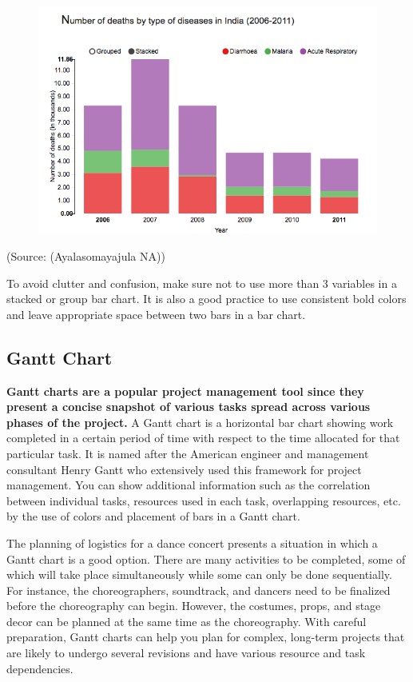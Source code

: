\documentclass[]{book}
\theoremstyle{definition}
\theoremstyle{definition}
\theoremstyle{definition}
\theoremstyle{remark}
\begin{document}
\begin{figure}
\centering
\includegraphics{images/aya-bar2.png}
\caption{}
\end{figure}

(Source: (Ayalasomayajula NA))

To avoid clutter and confusion, make sure not to use more than 3
variables in a stacked or group bar chart. It is also a good practice to
use consistent bold colors and leave appropriate space between two bars
in a bar chart.

\subsection{Gantt Chart}\label{gantt-chart}

\textbf{Gantt charts are a popular project management tool since they
present a concise snapshot of various tasks spread across various phases
of the project.} A Gantt chart is a horizontal bar chart showing work
completed in a certain period of time with respect to the time allocated
for that particular task. It is named after the American engineer and
management consultant Henry Gantt who extensively used this framework
for project management. You can show additional information such as the
correlation between individual tasks, resources used in each task,
overlapping resources, etc. by the use of colors and placement of bars
in a Gantt chart.

The planning of logistics for a dance concert presents a situation in
which a Gantt chart is a good option. There are many activities to be
completed, some of which will take place simultaneously while some can
only be done sequentially. For instance, the choreographers, soundtrack,
and dancers need to be finalized before the choreography can begin.
However, the costumes, props, and stage decor can be planned at the same
time as the choreography. With careful preparation, Gantt charts can
help you plan for complex, long-term projects that are likely to undergo
several revisions and have various resource and task dependencies.
\end{document}
